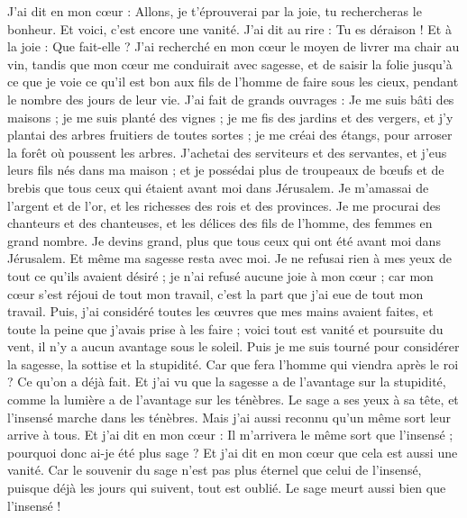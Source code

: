 \begin{multicols}{2}
\VerseOne{}J'ai dit en mon cœur : Allons, je t'éprouverai par la joie, tu rechercheras le bonheur. Et voici, c’est encore une vanité.
J'ai dit au rire : Tu es déraison ! Et à la joie : Que fait-elle ?
J'ai recherché en mon cœur le moyen de livrer ma chair au vin, tandis que mon cœur me conduirait avec sagesse, et de saisir la folie jusqu’à ce que je voie ce qu'il est bon aux fils de l’homme de faire sous les cieux, pendant le nombre des jours de leur vie.
J’ai fait de grands ouvrages : Je me suis bâti des maisons ; je me suis planté des vignes ;
je me fis des jardins et des vergers, et j'y plantai des arbres fruitiers de toutes sortes ;
je me créai des étangs, pour arroser la forêt où poussent les arbres.
J’achetai des serviteurs et des servantes, et j'eus leurs fils nés dans ma maison ; et je possédai plus de troupeaux de bœufs et de brebis que tous ceux qui étaient avant moi dans Jérusalem.
Je m’amassai de l'argent et de l'or, et les richesses des rois et des provinces. Je me procurai des chanteurs et des chanteuses, et les délices des fils de l’homme, des femmes en grand nombre.
Je devins grand, plus que tous ceux qui ont été avant moi dans Jérusalem. Et même ma sagesse resta avec moi.
Je ne refusai rien à mes yeux de tout ce qu'ils avaient désiré ; je n'ai refusé aucune joie à mon cœur ; car mon cœur s'est réjoui de tout mon travail, c'est la part que j'ai eue de tout mon travail.
Puis, j’ai considéré toutes les œuvres que mes mains avaient faites, et toute la peine que j’avais prise à les faire ; voici tout est vanité et poursuite du vent, il n’y a aucun avantage sous le soleil.
Puis je me suis tourné pour considérer la sagesse, la sottise et la stupidité. Car que fera l’homme qui viendra après le roi ? Ce qu’on a déjà fait.
Et j'ai vu que la sagesse a de l’avantage sur la stupidité, comme la lumière a de l’avantage sur les ténèbres.
Le sage a ses yeux à sa tête, et l’insensé marche dans les ténèbres. Mais j'ai aussi reconnu qu'un même sort leur arrive à tous.
Et j'ai dit en mon cœur : Il m'arrivera le même sort que l’insensé ; pourquoi donc ai-je été plus sage ? Et j'ai dit en mon cœur que cela est aussi une vanité.
Car le souvenir du sage n’est pas plus éternel que celui de l’insensé, puisque déjà les jours qui suivent, tout est oublié. Le sage meurt aussi bien que l’insensé !

\end{multicols}
